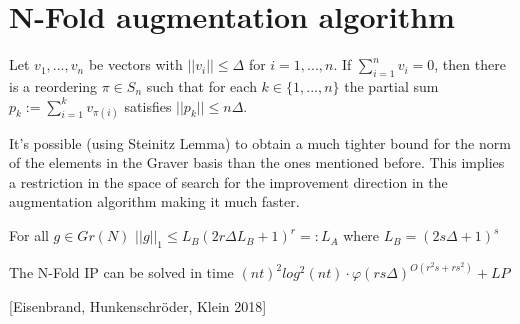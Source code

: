 \chapter{N-Fold augmentation algorithm} \label{framework}

\begin{lemma}
    Let $v_1,...,v_n$ be vectors with $||v_i|| \leq \Delta$ for $i = 1,...,n$. If $\sum_{i=1}^{n} v_i = 0$, then there is a reordering $\pi \in S_n$ such that for each $k \in \{1,...,n\}$ the partial sum $p_k := \sum_{i=1}^{k}v_{\pi(i)}$ satisfies $||p_k|| \leq n\Delta$.
\end{lemma}

It's possible (using Steinitz Lemma) to obtain a much tighter bound for the norm of the elements in the Graver basis than the ones mentioned before. This implies a restriction in the space of search for the improvement direction in the augmentation algorithm making it much faster.

\begin{lemma}
    For all $g \in Gr(N)$ $||g||_1 \leq L_B (2r\Delta L_B + 1)^r =: L_A$ where $L_B = (2s \Delta + 1)^s$
\end{lemma}

\begin{lemma}
    The N-Fold IP can be solved in time $(nt)^2 log^2(nt) \cdot \varphi (rs\Delta)^{O(r^2s + rs^2)} + LP$
\end{lemma}
\hspace{15pt} [Eisenbrand, Hunkenschröder, Klein 2018]
        